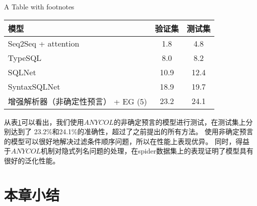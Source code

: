 \begin{table}[!htpb]
    {A Table with footnotes}
  \label{tab:ssjjsdsyjg}
  \centering
  \begin{threeparttable}[b]
     \begin{tabular}{lcc}
      \toprule
      模型 & 验证集 & 测试集\\
      \midrule
      Seq2Seq + attention & 1.8	& 4.8\\
      TypeSQL & 8.0	& 8.2\\
      SQLNet & 10.9	& 12.4\\
      SyntaxSQLNet & 18.9	& 19.7\\
      增强解析器（非确定性预言） + EG (5) & 23.2  & 24.1\\
      \bottomrule
    \end{tabular}
  \end{threeparttable}
\end{table}

从表\ref{tab:ssjjsdsyjg}可以看出，我们使用$ANYCOL$的非确定预言的模型进行测试，在测试集上分别达到了 23.2\%和24.1\%的准确性，超过了之前提出的所有方法。
使用非确定预言的模型可以很好地解决过滤条件顺序问题，所以在性能上表现优异。
同时，得益于$ANYCOL$机制对隐式列名问题的处理，在spider数据集上的表现证明了模型具有很好的泛化性能。


\section{本章小结}
